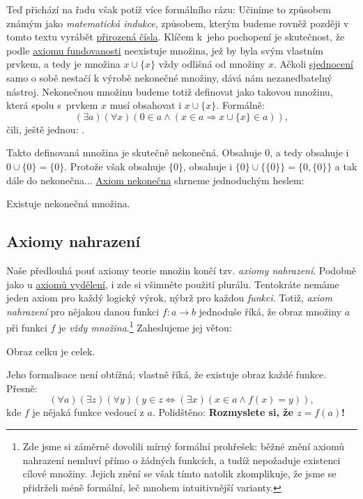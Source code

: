 Teď přichází na řadu však potíž více formálního rázu:  Učiníme to způsobem známým jako \emph{matematická indukce},
způsobem, kterým budeme rovněž později v tomto textu vyrábět
\hyperref[chap:prirozena-cisla]{přirozená čísla}. Klíčem k~jeho pochopení je
skutečnost, že podle \hyperref[eq:axiom-fundovanosti]{axiomu fundovanosti}
neexistuje množina, jež by byla svým vlastním prvkem, a tedy je množina $x \cup
\{x\}$ vždy odlišná od množiny $x$. Ačkoli
\hyperref[def:sjednoceni-mnozin]{sjednocení} samo o sobě nestačí k výrobě
nekonečné množiny, dává nám nezanedbatelný nástroj. Nekonečnou množinu budeme
totiž definovat jako takovou množinu, která spolu s~prvkem $x$ musí obsahovat i
$x \cup \{x\}$. Formálně:
\begin{equation} \label{eq:axiom-nekonecna} ( \exists
  a)( \forall x)(0 \in a \wedge (x \in a \Rightarrow x \cup \{x\} \in a)),
\end{equation} čili, ještě jednou: .

Takto definovaná množina je skutečně nekonečná. Obsahuje $0$, a tedy obsahuje i
${0 \cup \{0\}} = \{0\}$. Protože však obsahuje $\{0\}$, obsahuje i $\{0\} \cup
\{\{0\}\} = \{0, \{0\}\}$ a tak dále do nekonečna...
\hyperref[eq:axiom-nekonecna]{Axiom nekonečna} shrneme jednoduchým heslem:
\begin{highlightBox}
  \alert{Existuje nekonečná množina.}
\end{highlightBox}

\subsection{Axiomy nahrazení}
\label{ssec:axiomy-nahrazeni}

Naše předlouhá pouť axiomy teorie množin končí tzv. \emph{axiomy nahrazení}.
Podobně jako u \hyperref[ssec:axiomy-vydeleni]{axiomů vydělení}, i zde si
všimněte použití plurálu. Tentokráte nemáme jeden axiom pro každý logický výrok,
nýbrž pro každou \emph{funkci}. Totiž, \emph{axiom nahrazení} pro nějakou danou
funkci $f\colon a \to b$ jednoduše říká, že obraz množiny $a$ při funkci $f$ je
\emph{vždy množina}.\footnote{Zde jsme si záměrně dovolili mírný formální
  prohřešek: běžné znění axiomů nahrazení nemluví přímo o žádných funkcích, a
  tudíž nepožaduje existenci cílové množiny. Jejich znění se však tímto natolik
  zkomplikuje, že jsme se přidrželi méně formální, leč mnohem intuitivnější
varianty.} Zaheslujeme jej větou:
\begin{highlightBox}
  \alert{Obraz celku je celek.}
\end{highlightBox}
Jeho formalisace není obtížná; vlastně říká, že existuje obraz každé funkce.
Přesně:
\begin{equation}
  \label{eq:axiom-nahrazeni}
  ( \forall a)( \exists z)( \forall y)(y \in z \Leftrightarrow ( \exists x)(x
  \in a \wedge f(x) = y)),
\end{equation}
kde $f$ je nějaká funkce vedoucí z $a$. Polidštěno:  \textbf{Rozmyslete si, že $z = f(a)$!}

